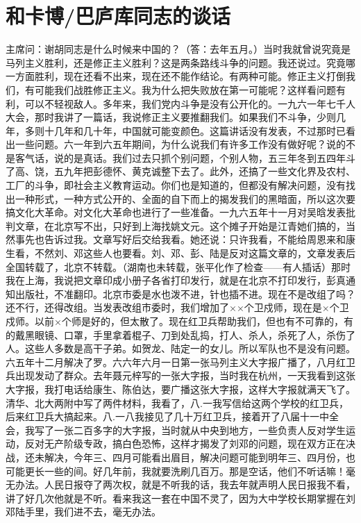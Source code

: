 \section[和卡博/巴庐库同志的谈话（一九六七年二月三日）]{和卡博/巴庐库同志的谈话}


主席问：谢胡同志是什么时候来中国的？（答：去年五月。）当时我就曾说究竟是马列主义胜利，还是修正主义胜利？这是两条路线斗争的问题。我还说过。究竟哪一方面胜利，现在还看不出来，现在还不能作结论。有两种可能。修正主义打倒我们，有可能我们战胜修正主义。我为什么把失败放在第一可能呢？这样看问题有利，可以不轻视敌人。多年来，我们党内斗争是没有公开化的。一九六一年七千人大会，那时我讲了一篇话，我说修正主义要推翻我们。如果我们不斗争，少则几年，多则十几年和几十年，中国就可能变颜色。这篇讲话没有发表，不过那时已看出一些问题。六一年到六五年期间，为什么说我们有许多工作没有做好呢？说的不是客气话，说的是真话。我们过去只抓个别问题，个别人物，五三年冬到五四年斗了高、饶，五九年把彭德怀、黄克诚整下去了。此外，还搞了一些文化界及农村、工厂的斗争，即社会主义教育运动。你们也是知道的，但都没有解决问题，没有找出一种形式，一种方式公开的、全面的自下而上的揭发我们的黑暗面，所以这次要搞文化大革命。对文化大革命也进行了一些准备。一九六五年十一月对吴晗发表批判文章，在北京写不出，只好到上海找姚文元。这个摊子开始是江青她们搞的，当然事先也告诉过我。文章写好后交给我看。她还说：只许我看，不能给周恩来和康生看，不然刘、邓这些人也要看。刘、邓、彭、陆是反对这篇文章的，文章发表后全国转载了，北京不转载。（湖南也未转载，张平化作了检查——有人插话）那时我在上海，我说把文章印成小册子各省打印发行，就是在北京不打印发行，彭真通知出版社，不准翻印。北京市委是水也泼不进，针也插不进。现在不是改组了吗？还不行，还得改组。当发表改组市委时，我们增加了××个卫戍师，现在是×个卫戍师。以前×个师是好的，但太散了。现在红卫兵帮助我们，但也有不可靠的，有的戴黑眼镜、口罩，手里拿着棍子、刀到处乱捣，打人、杀人，杀死了人，杀伤了人。这些人多数是高干子弟。如贺龙、陆定一的女儿。所以军队也不是没有问题。六五年十二月解决了罗。六六年六月一日第一张马列主义大字报广播了，八月红卫兵出现发动了群众。去年聂元梓写的一张大字报，当时我在杭州，一天我看到这张大字报，我打电话给康生、陈伯达，要广播这张大字报，这样大字报就满天飞了。清华、北大两附中写了两件材料，我看了，八.一我写信给这两个学校的红卫兵，后来红卫兵大搞起来。八.一八我接见了几十万红卫兵，接着开了八届十一中全会，我写了一张二百多字的大字报，当时就从中央到地方，一些负责人反对学生运动，反对无产阶级专政，搞白色恐怖，这样才揭发了刘邓的问题，现在双方正在决战，还未解决，今年三、四月可能看出眉目，解决问题可能到明年三、四月份，也可能更长一些的间。好几年前，我就要洗刷几百万。那是空话，他们不听话嘛！毫无办法。人民日报夺了两次权，就是不听我的话，我去年就声明人民日报我不看，讲了好几次他就是不听。看来我这一套在中国不灵了，因为大中学校长期掌握在刘邓陆手里，我们进不去，毫无办法。

